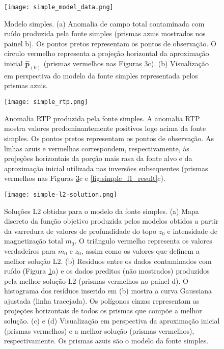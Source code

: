 \pagebreak

\begin{figure}[!htb]
	\centering
	\texttt{[image: simple\_model\_data.png]}
	\caption{Modelo simples. (a) Anomalia de campo total contaminada com ruído produzida pela fonte simples (prismas azuis mostrados nos painel b). Os pontos pretos representam os pontos de observação. O círculo vermelho representa a projeção horizontal da aproximação inicial $\hat{\mathbf{p}}_{(0)}$ (prismas vermelhos nas Figuras
		\ref{fig:simple_l2_result}c). %
		(b) Visualização em perspectiva do modelo da fonte simples representada pelos prismas azuis.
	}
	\label{fig:simple_model}
\end{figure}

\pagebreak

\begin{figure}[!htb]
	\centering
	\texttt{[image: simple\_rtp.png]}
	\caption{Anomalia RTP produzida pela fonte simples. 
		A anomalia RTP mostra valores predominantemente positivos logo acima da fonte simples. Os pontos pretos representam os pontos de observação. As linhas azuis e vermelhas correspondem, respectivamente, às projeções horizontais da porção mais rasa da fonte alvo e da aproximação inicial utilizada nas inversões subsequentes (prismas vermelhos nas Figuras \ref{fig:simple_l2_result}c e 
		\ref{fig:simple_l1_result}c).
	}
	\label{fig:simple_model_rtp}
\end{figure}

\pagebreak

\begin{figure}[!htb]
	\centering
	\texttt{[image: simple-l2-solution.png]}
	\caption{Soluções L2 obtidas para o modelo da fonte simples. 
		(a) Mapa discreto da função objetivo produzida pelos modelos obtidos a partir da varredura de valores de profundidade do topo $z_{0}$ e intensidade de magnetização total $m_{0}$. 
		O triângulo vermelho representa os valores verdadeiros para $m_{0}$ e $z_{0}$, assim como os valores que definem a melhor solução L2.
		(b) Resíduos entre os dados contaminados com ruído (Figura \ref{fig:simple_model}a) 
		e os dados preditos (não mostrados) produzidos pela melhor solução L2 (prismas vermelhos no painel d). 
		O histograma dos resíduos inserido em (b) mostra a curva Gaussiana ajustada (linha tracejada).
		Os polígonos cinzas representam as projeções horizontais de todos os prismas que compõe a melhor solução. 
		(c) e (d) Visualização em perspectiva da aproximação inicial (prismas vermelhos) e 
		a melhor solução (prismas vermelhos), respectivamente. Os prismas azuis são o modelo da fonte simples. 
	}
	\label{fig:simple_l2_result}
\end{figure}
\pagebreak

